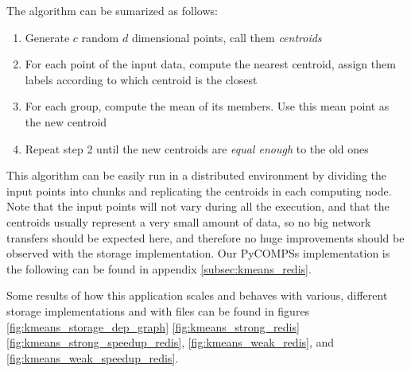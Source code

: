 The algorithm can be sumarized as follows:

\begin{enumerate}
\item Generate $c$ random $d$ dimensional points, call them \textit{centroids}
\item For each point of the input data, compute the nearest centroid, assign them labels according to which centroid is the closest
\item For each group, compute the mean of its members. Use this mean point as the new centroid
\item Repeat step 2 until the new centroids are \textit{equal enough} to the old ones
\end{enumerate}

This algorithm can be easily run in a distributed environment by dividing the input points into chunks and replicating the centroids in each computing node. Note that the input points will not vary during all the execution, and that the centroids usually represent a very small amount of data, so no big network transfers should be expected here, and therefore no huge improvements should be observed with the storage implementation. Our PyCOMPSs implementation is the following can be found in appendix \ref{subsec:kmeans_redis}.

Some results of how this application scales and behaves with various, different storage implementations and with files can be found in figures \ref{fig:kmeans_storage_dep_graph} \ref{fig:kmeans_strong_redis} \ref{fig:kmeans_strong_speedup_redis}, \ref{fig:kmeans_weak_redis}, and \ref{fig:kmeans_weak_speedup_redis}.

